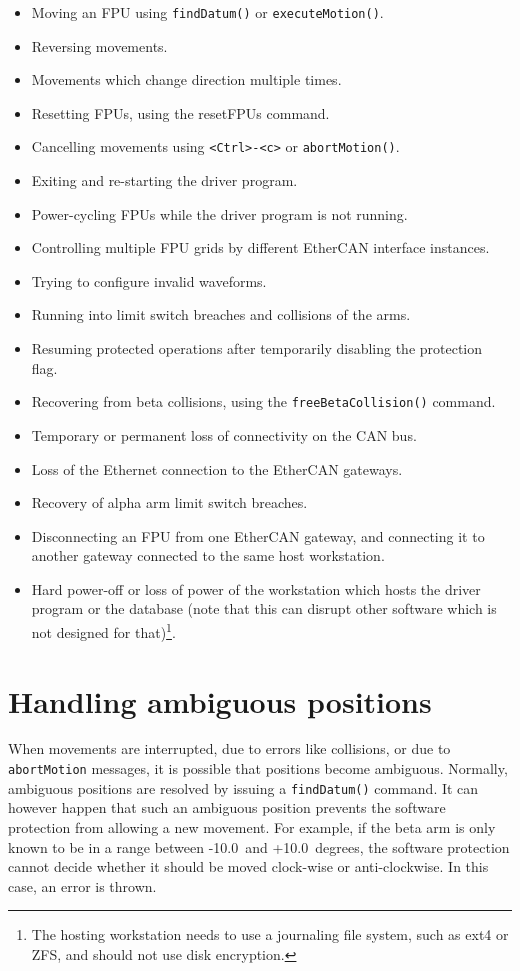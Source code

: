 \documentclass[fontsize=12,a4paper]{scrreprt}
\begin{document}
\begin{itemize}
\item Moving an FPU using \texttt{findDatum()} or \texttt{executeMotion()}.
\item Reversing movements.
\item Movements which change direction multiple times.
\item Resetting FPUs, using the resetFPUs command.
\item Cancelling movements using \verb+<Ctrl>-<c>+ or \texttt{abortMotion()}.
\item Exiting and re-starting the driver program.
\item Power-cycling FPUs while the driver program is not running.
\item Controlling multiple FPU grids by different EtherCAN interface instances.
\item Trying to configure invalid waveforms.
\item Running into limit switch breaches and collisions of the arms.
\item Resuming protected operations after temporarily disabling the
  protection flag.
\item Recovering from beta collisions, using the
  \texttt{freeBetaCollision()} command.
\item Temporary or permanent loss of connectivity on the CAN bus.
\item Loss of the Ethernet connection to the EtherCAN gateways.
\item Recovery of alpha arm limit switch breaches.
\item Disconnecting an FPU from one EtherCAN gateway, and connecting
  it to another gateway connected to the same host workstation.
\item Hard power-off or loss of power of the workstation which hosts
  the driver program or the database (note that this can disrupt other
  software which is not designed for that)\footnote{The hosting
    workstation needs to use a journaling file system, such as ext4 or
    ZFS, and should not use disk encryption.}.
\end{itemize}

\section{Handling ambiguous positions}
%
When movements are interrupted, due to errors like collisions, or due
to \texttt{abortMotion} messages, it is possible that positions become
ambiguous. Normally, ambiguous positions are resolved by issuing a
\texttt{findDatum()} command.  It can however happen that such an
ambiguous position prevents the software protection from allowing a
new movement.  For example, if the beta arm is only known to be in a
range between -10.0\degree\ and +10.0\degree\ degrees, the software
protection cannot decide whether it should be moved clock-wise or
anti-clockwise. In this case, an error is thrown.
\end{document}
